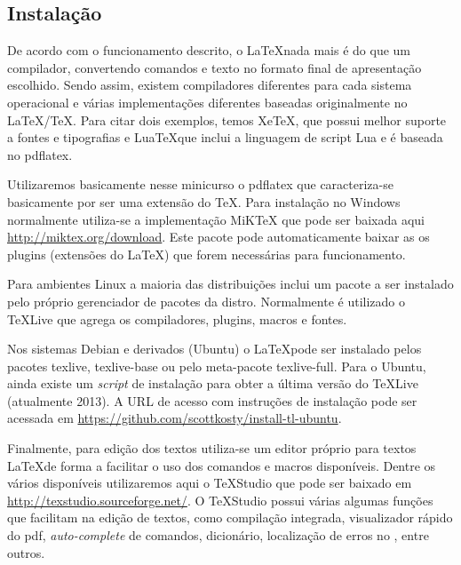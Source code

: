 \subsection{Instalação}
De acordo com o funcionamento descrito, o \LaTeX nada mais é do que um compilador, convertendo comandos e texto no formato final de apresentação escolhido. Sendo assim, existem compiladores diferentes para cada sistema operacional e várias implementações diferentes baseadas originalmente no \LaTeX/\TeX. Para citar dois exemplos, temos Xe\TeX\cite{xetex}, que possui melhor suporte a fontes e tipografias e 
Lua\TeX que inclui a linguagem de script Lua e é baseada no \textsf{pdflatex}.

Utilizaremos basicamente nesse minicurso o \textsf{pdflatex} que caracteriza-se basicamente por ser uma extensão do \TeX. Para instalação no Windows normalmente utiliza-se a implementação MiK\TeX\cite{miktex} que pode ser baixada aqui \url{http://miktex.org/download}. Este pacote pode automaticamente baixar as os plugins (extensões do \LaTeX) que forem necessárias para funcionamento.

Para ambientes Linux a maioria das distribuições inclui um pacote a ser instalado pelo próprio gerenciador de pacotes da distro. Normalmente é utilizado o \TeX Live que agrega os compiladores, plugins, macros e fontes.

Nos sistemas Debian e derivados (Ubuntu) o \LaTeX pode ser instalado pelos pacotes \textsf{texlive}, \textsf{texlive-base} ou pelo meta-pacote \textsf{texlive-full}. Para o Ubuntu, ainda existe um \textit{script} de instalação\cite{intall-tl-ubuntu} para obter a última versão do \TeX Live (atualmente 2013). A URL de acesso com instruções de instalação pode ser acessada em \url{https://github.com/scottkosty/install-tl-ubuntu}.

Finalmente, para edição dos textos utiliza-se um editor próprio para textos \LaTeX de forma a facilitar o uso dos comandos e macros disponíveis. Dentre os vários disponíveis\cite{wiki:texEditors} utilizaremos aqui o TeXStudio\cite{texstudio} que pode ser baixado em \url{http://texstudio.sourceforge.net/}. O TeXStudio possui várias algumas funções que facilitam na edição de textos, como compilação integrada, visualizador rápido do pdf, \textit{auto-complete} de comandos, dicionário, localização de erros no \tex	, entre outros.